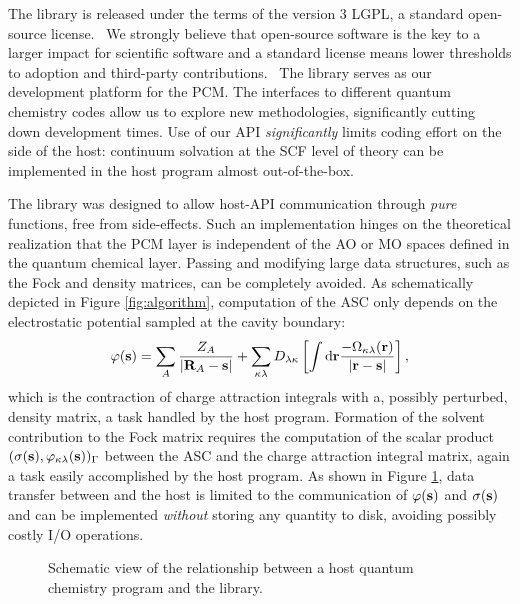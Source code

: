 The library is released under the terms of the
version 3 \ac{LGPL}, a standard open-source license.~\autocite{LGPLv3}
We strongly believe that open-source software is the key to a larger
impact for scientific software and a standard license means lower
thresholds to adoption and third-party contributions.~\autocite{LGPLv3}
The library serves as our development platform for the \acs{PCM}.
The interfaces to different quantum chemistry codes allow us to explore
new methodologies, significantly cutting down development times.
Use of our \acs{API} \emph{significantly} limits coding effort on the
side of the host: continuum solvation at the \acs{SCF} level of theory
can be implemented in the host program almost out-of-the-box.

The library was designed to allow host-\acs{API} communication through
\emph{pure} functions, \ie{} free from side-effects.
Such an implementation hinges on the theoretical realization that the
\acs{PCM} layer is independent of the \acs{AO} or \acs{MO} spaces
defined in the quantum chemical layer.
Passing and modifying large data structures, such as the Fock and
density matrices, can be completely avoided.
As schematically depicted in Figure \ref{fig:algorithm},
computation of the \acs{ASC} only depends on
the electrostatic potential sampled at the cavity boundary:
\begin{equation}
 \varphi(\mathbf{s}) =
 \sum_A \frac{Z_A}{|\mathbf{R}_A-\mathbf{s}|} +  \sum_{\kappa\lambda} D_{\lambda\kappa}
 \left[\int\mathop{}\!\mathrm{d}\mathbf{r}\frac{-\Omega_{\kappa\lambda}(\mathbf{r})}{|\mathbf{r}-\mathbf{s}|}\right],
\end{equation}
which is the contraction of charge attraction integrals with a, possibly
perturbed, density matrix, a task handled by the host program.
Formation of the solvent contribution to the Fock matrix requires the
computation of the scalar product
$(\sigma(\mathbf{s}), \varphi_{\kappa\lambda}(\mathbf{s}))_{\Gamma}$
between the \acs{ASC} and the charge attraction integral matrix, again
a task easily accomplished by the host program.
As shown in Figure \ref{fig:pcmsolver-scheme}, data transfer between
\pcmsolver and the host is limited to the communication of
$\varphi(\mathbf{s})$ and $\sigma(\mathbf{s})$ and can be implemented
\emph{without} storing any quantity to disk, avoiding possibly costly
I/O operations.

\begin{figure}[tb]
  \centering
  \scalebox{0.7}{}
  \caption[Schematic view of the relationship between a host quantum chemistry
  program and the \pcmsolver library.]{
  Schematic view of the relationship between a host quantum chemistry
  program and the \pcmsolver library.
  }
  \label{fig:pcmsolver-scheme}
\end{figure}


